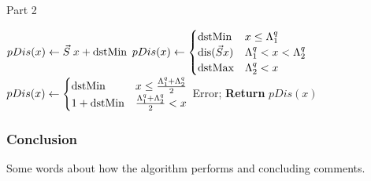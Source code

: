 \addtocounter{algorithm}{-1}
\begin{algorithm}[h]
\caption{Part 2}
\begin{algorithmic}[1]
          \State   
          $  pDis(x) \gets \Scale \; x + \dstMin $
         \State  
         $ pDis(x) \gets \begin{cases}
          \dstMin & x \le \Discard_1^q \\
          \text{dis}(\Scale x) & \Discard_1^q < x < \Discard_2^q \\
          \dstMax & \Discard_2^q < x  \\
          \end{cases} $
         \State   
         $  pDis(x) \gets \begin{cases}
           \text{dstMin} & x \le \frac{\Lambda_1^q + \Lambda_2^q}{2} \\
           1 + \text{dstMin}  &  \frac{\Lambda_1^q + \Lambda_2^q}{2} < x\\
           \end{cases} $
            \Else {}
            \State Error; 
            \EndIf
            \State \textbf{Return} {$pDis(x)$}
\end{algorithmic}
\end{algorithm}

\subsubsection{Conclusion}
Some words about how the algorithm performs and concluding comments.




